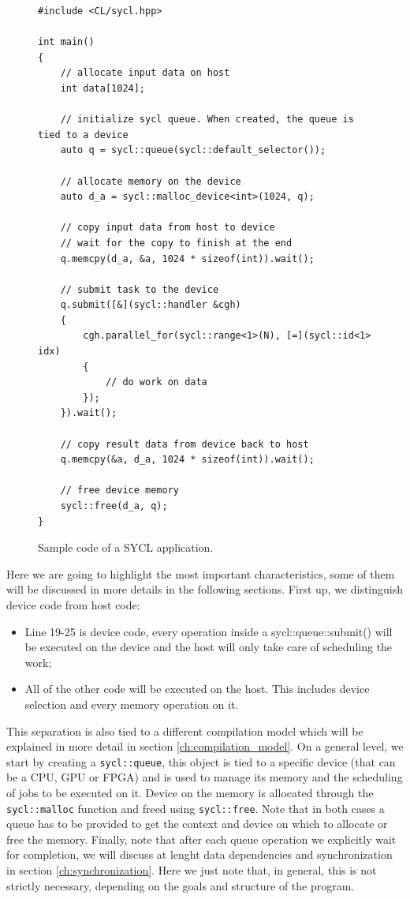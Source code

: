 \begin{figure}[ht!]
\renewcommand{\figurename}{Code}
\begin{verbatim}
#include <CL/sycl.hpp>

int main()
{
    // allocate input data on host
    int data[1024];
    
    // initialize sycl queue. When created, the queue is tied to a device
    auto q = sycl::queue(sycl::default_selector());
    
    // allocate memory on the device
    auto d_a = sycl::malloc_device<int>(1024, q);
    
    // copy input data from host to device
    // wait for the copy to finish at the end
    q.memcpy(d_a, &a, 1024 * sizeof(int)).wait();

    // submit task to the device
    q.submit([&](sycl::handler &cgh)
    {
        cgh.parallel_for(sycl::range<1>(N), [=](sycl::id<1> idx)
        {
            // do work on data
        });
    }).wait();
    
    // copy result data from device back to host
    q.memcpy(&a, d_a, 1024 * sizeof(int)).wait();
    
    // free device memory
    sycl::free(d_a, q);
}
\end{verbatim}
\caption{Sample code of a SYCL application.}
\label{code:simple_ex}
\end{figure}

Here we are going to highlight the most important characteristics, some of them will be discussed in more details in the following sections. First up, we distinguish device code from host code: 
\begin{itemize}
    \item Line 19-25 is device code, every operation inside a sycl::queue::submit() will be executed on the device and the host will only take care of scheduling the work;
    \item All of the other code will be executed on the host. This includes device selection and every memory operation on it.
\end{itemize}
This separation is also tied to a different compilation model which will be explained in more detail in section \ref{ch:compilation_model}. On a general level, we start by creating a \Verb "sycl::queue", this object is tied to a specific device (that can be a CPU, GPU or FPGA) and is used to manage its memory and the scheduling of jobs to be executed on it. Device on the memory is allocated through the \Verb "sycl::malloc" function and freed using \Verb "sycl::free". Note that in both cases a queue has to be provided to get the context and device on which to allocate or free the memory. Finally, note that after each queue operation we explicitly wait for completion, we will discuss at lenght data dependencies and synchronization in section \ref{ch:synchronization}. Here we just note that, in general, this is not strictly necessary, depending on the goals and structure of the program.

